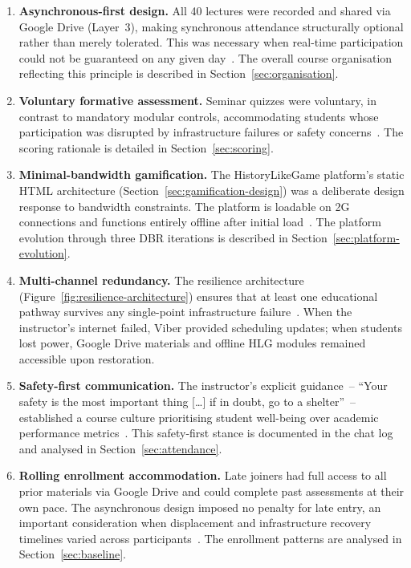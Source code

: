\begin{enumerate}
\item \textbf{Asynchronous-first design.} All 40 lectures were recorded and shared via Google Drive (Layer~3), making synchronous attendance structurally optional rather than merely tolerated. This was necessary when real-time participation could not be guaranteed on any given day~\cite{Tamim2011, Hlianenko2024}. The overall course organisation reflecting this principle is described in Section~\ref{sec:organisation}.

\item \textbf{Voluntary formative assessment.} Seminar quizzes were voluntary, in contrast to mandatory modular controls, accommodating students whose participation was disrupted by infrastructure failures or safety concerns~\cite{Hickey2015}. The scoring rationale is detailed in Section~\ref{sec:scoring}.

\item \textbf{Minimal-bandwidth gamification.} The HistoryLikeGame platform's static HTML architecture (Section~\ref{sec:gamification-design}) was a deliberate design response to bandwidth constraints. The platform is loadable on 2G connections and functions entirely offline after initial load~\cite{KorniienkoSemerikov2024}. The platform evolution through three DBR iterations is described in Section~\ref{sec:platform-evolution}.

\item \textbf{Multi-channel redundancy.} The resilience architecture (Figure~\ref{fig:resilience-architecture}) ensures that at least one educational pathway survives any single-point infrastructure failure~\cite{Vovchasta2024}. When the instructor's internet failed, Viber provided scheduling updates; when students lost power, Google Drive materials and offline HLG modules remained accessible upon restoration.

\item \textbf{Safety-first communication.} The instructor's explicit guidance~-- ``Your safety is the most important thing [\ldots] if in doubt, go to a shelter''~-- established a course culture prioritising student well-being over academic performance metrics~\cite{UNESCO2023}. This safety-first stance is documented in the chat log and analysed in Section~\ref{sec:attendance}.

\item \textbf{Rolling enrollment accommodation.} Late joiners had full access to all prior materials via Google Drive and could complete past assessments at their own pace. The asynchronous design imposed no penalty for late entry, an important consideration when displacement and infrastructure recovery timelines varied across participants~\cite{Zamkova2023299}. The enrollment patterns are analysed in Section~\ref{sec:baseline}.
\end{enumerate}


